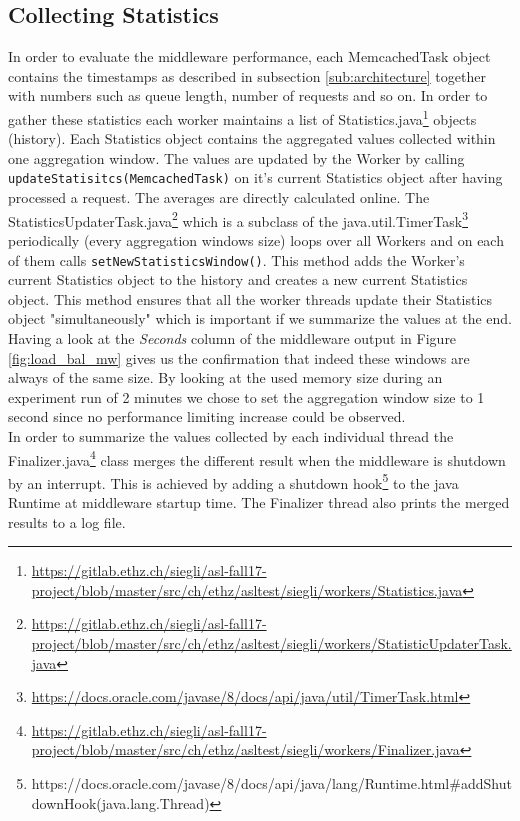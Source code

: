 \documentclass[11pt,a4paper]{article}
\let\ti\textit
\let\tt\texttt
\begin{document}
\subsection{Collecting Statistics}\label{sub:stat}
In order to evaluate the middleware performance, each MemcachedTask object contains the timestamps as described in subsection \ref{sub:architecture} together with numbers such as queue length, number of requests and so on. In order to gather these statistics each worker maintains a list of Statistics.java\footnote{\url{https://gitlab.ethz.ch/siegli/asl-fall17-project/blob/master/src/ch/ethz/asltest/siegli/workers/Statistics.java}} objects (history). Each Statistics object contains the aggregated values collected within one aggregation window. The values are updated by the Worker by calling \tt{updateStatisitcs(MemcachedTask)} on it's current Statistics object after having processed a request. The averages are directly calculated online.
The StatisticsUpdaterTask.java\footnote{\url{https://gitlab.ethz.ch/siegli/asl-fall17-project/blob/master/src/ch/ethz/asltest/siegli/workers/StatisticUpdaterTask.java}} which is a subclass of the java.util.TimerTask\footnote{\url{https://docs.oracle.com/javase/8/docs/api/java/util/TimerTask.html}}
 periodically (every aggregation windows size) loops over all Workers and on each of them calls \tt{setNewStatisticsWindow()}. This method adds the Worker's current Statistics object to the history and creates a new current Statistics object. This method ensures that all the worker threads update their Statistics object "simultaneously" which is important if we summarize the values at the end. Having a look at the \ti{Seconds} column of the middleware output in Figure \ref{fig:load_bal_mw} gives us the confirmation that indeed these windows are always of the same size. By looking at the used memory size during an experiment run of 2 minutes we chose to set the aggregation window size to 1 second since no performance limiting increase could be observed.
 \\In order to summarize the values collected by each individual thread the Finalizer.java\footnote{\url{https://gitlab.ethz.ch/siegli/asl-fall17-project/blob/master/src/ch/ethz/asltest/siegli/workers/Finalizer.java}} class merges the different result when the middleware is shutdown by an interrupt. This is achieved by adding a shutdown hook\footnote{ https://docs.oracle.com/javase/8/docs/api/java/lang/Runtime.html\#addShutdownHook(java.lang.Thread)} to the java Runtime at middleware startup time. The Finalizer thread also prints the merged results to a log file.\\
\end{document}
